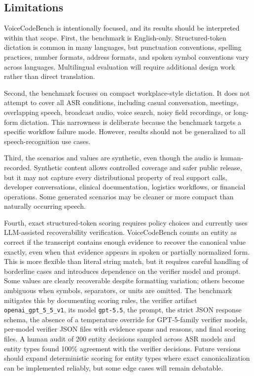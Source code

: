 \documentclass[10pt,twocolumn]{article}
\begin{document}
\subsection{Limitations}\label{limitations}

VoiceCodeBench is intentionally focused, and its results should be
interpreted within that scope. First, the benchmark is English-only.
Structured-token dictation is common in many languages, but punctuation
conventions, spelling practices, number formats, address formats, and
spoken symbol conventions vary across languages. Multilingual evaluation
will require additional design work rather than direct translation.

Second, the benchmark focuses on compact workplace-style dictation. It
does not attempt to cover all ASR conditions, including casual
conversation, meetings, overlapping speech, broadcast audio, voice
search, noisy field recordings, or long-form dictation. This narrowness
is deliberate because the benchmark targets a specific workflow failure
mode.
However, results should not be generalized to all speech-recognition use
cases.

Third, the scenarios and values are synthetic, even though the audio is
human-recorded. Synthetic content allows controlled coverage and safer
public release, but it may not capture every distributional property of
real support calls, developer conversations, clinical documentation,
logistics workflows, or financial operations. Some generated scenarios
may be cleaner or more compact than naturally occurring speech.

Fourth, exact structured-token scoring requires policy choices and
currently uses LLM-assisted recoverability verification. VoiceCodeBench
counts an entity as correct if the transcript contains enough evidence
to recover the canonical value exactly, even when that evidence appears
in spoken or partially normalized form. This is more flexible than
literal string match, but it requires careful handling of borderline
cases and introduces dependence on the verifier model and prompt. Some
values are clearly recoverable despite formatting variation; others
become ambiguous when symbols, separators, or units are omitted. The
benchmark mitigates this by documenting scoring rules, the verifier
artifact \texttt{openai\_gpt\_5\_5\_v1}, its model \texttt{gpt-5.5}, the
prompt, the strict JSON response schema, the absence of a temperature override
for GPT-5-family verifier models,
per-model verifier JSON files with evidence spans and reasons, and final
scoring files. A human audit of 200 entity decisions sampled across ASR
models and entity types found 100\% agreement with the verifier decisions.
Future versions should expand deterministic scoring for entity types where
exact canonicalization can be implemented reliably, but some edge cases will
remain debatable.
\end{document}

